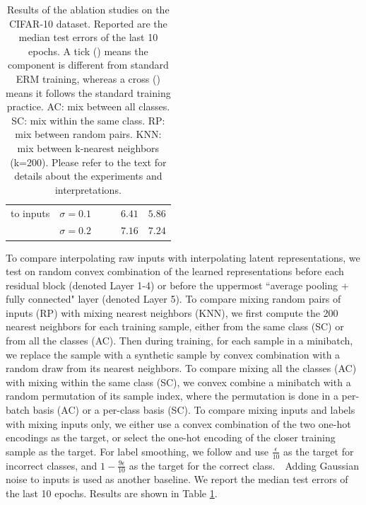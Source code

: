 \begin{table}
\begin{tabular}[b]{ll rr rr}
		to inputs & $\sigma=0.1$ & \cmark & \xmark & $6.41$ & $5.86$ \\
		& $\sigma=0.2$ & \cmark & \xmark & $7.16$ & $7.24$ \\
		\bottomrule
	\end{tabular}
	\caption{Results of the ablation studies on the CIFAR-10 dataset. Reported are the median test errors of the last 10 epochs. A tick (\cmark) means the component is different from standard ERM training, whereas a cross (\xmark) means it follows the standard training practice. AC: mix between all classes. SC: mix within the same class. RP: mix between random pairs. KNN: mix between k-nearest neighbors (k=200). Please refer to the text for details about the experiments and interpretations.}
	\label{table:ablation}
\end{table}

To compare interpolating raw inputs with interpolating latent representations, we test on random convex combination of the learned representations before each residual block (denoted Layer 1-4) or before the uppermost ``average pooling + fully connected" layer (denoted Layer 5). To compare mixing random pairs of inputs (RP) with mixing nearest neighbors (KNN), we first compute the 200 nearest neighbors for each training sample, either from the same class (SC) or from all the classes (AC). Then during training, for each sample in a minibatch, we replace the sample with a synthetic sample by convex combination with a random draw from its nearest neighbors. To compare mixing all the classes (AC) with mixing within the same class (SC), we convex combine a minibatch with a random permutation of its sample index, where the permutation is done in a per-batch basis (AC) or a per-class basis (SC). To compare mixing inputs and labels with mixing inputs only, we either use a convex combination of the two one-hot encodings as the target, or select the one-hot encoding of the closer training sample as the target. For label smoothing, we follow \cite{szegedy2016rethinking} and use $\frac{\epsilon}{10}$ as the target for incorrect classes, and $1-\frac{9\epsilon}{10}$ as the target for the correct class.　Adding Gaussian noise to inputs is used as another baseline. We report the median test errors of the last 10 epochs. Results are shown in Table \ref{table:ablation}.


